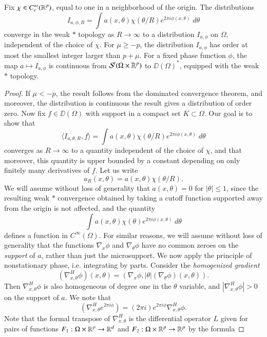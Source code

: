 \begin{theorem}
	Fix $\chi \in C_c^\infty(\operatorname{\mathbb{R}}^p)$, equal to one in a neighborhood of the origin. The distributions
	\[ I_{a,\phi,R} = \int a(x,\theta) \chi(\theta / R) e^{2 \pi i \phi(x,\theta)}\; d\theta \]
	converge in the weak $*$ topology as $R \to \infty$ to a distribution $I_{a,\phi}$ on $\Omega$, independent of the choice of $\chi$. For $\mu \geq -p$, the distribution $I_{a,\phi}$ has order at most the smallest integer larger than $p + \mu$. For a fixed phase function $\phi$, the map $a \mapsto I_{a,\phi}$ is continuous from $\operatorname{\mathcal{S}}^t(\Omega \times \operatorname{\mathbb{R}}^p)$ to $\DD(\Omega)^*$, equipped with the weak $*$ topology.
\end{theorem}
\begin{proof}
	If $\mu < -p$, the result follows from the dominated convergence theorem, and moreover, the distribution is continuous the result gives a distribution of order zero. Now fix $f \in \DD(\Omega)$ with support in a compact set $K \subset \Omega$. Our goal is to show that
	\[ \langle I_{a,\theta,R}, f \rangle = \int a(x,\theta) \chi(\theta / R) e^{2 \pi i \phi(x,\theta)}\; d\theta \]
	converges as $R \to \infty$ to a quantity independent of the choice of $\chi$, and that moreover, this quantity is upper bounded by a constant depending on only finitely many derivatives of $f$. Let us write
	\[ a_R(x,\theta) = a(x, \theta) \chi(\theta / R). \]
	We will assume without loss of generality that $a(x,\theta) = 0$ for $|\theta| \leq 1$, since the resulting weak $*$ convergence obtained by taking a cutoff function supported away from the origin is not affected, and the quantity
	\[ \int a(x,\theta) \chi(\theta) e^{2 \pi i \phi(x,\theta)}\; d\theta \]
	defines a function in $C^\infty(\Omega)$. For similar reasons, we will assume without loss of generality that the functions $\nabla_x \phi$ and $\nabla_\theta \phi$ have no common zeroes on the \emph{support} of $a$, rather than just the microsupport. We now apply the principle of nonstationary phase, i.e. integrating by parts. Consider the \emph{homogenized gradient}
	\[ (\nabla_{x,\theta}^H \phi)(x,\theta) = ( \nabla_x \phi, |\theta| (\nabla_\theta \phi)(x,\theta) ). \]
	Then $\nabla_{x,\theta}^H \phi$ is also homogeneous of degree one in the $\theta$ variable, and $|\nabla_{x,\theta}^H \phi| > 0$ on the support of $a$. We note that
	\[ (\nabla_{x,\theta}^H e^{2 \pi i \phi} ) = (2 \pi i) e^{2 \pi i \phi} \nabla_{x,\theta}^H \phi. \]
	Note that the formal transpose of $\nabla_{x,\theta}^H$ is the differential operator $L$ given for pairs of functions $F_1: \Omega \times \operatorname{\mathbb{R}}^p \to \operatorname{\mathbb{R}}^d$ and $F_2: \Omega \times \operatorname{\mathbb{R}}^p \to \operatorname{\mathbb{R}}^p$ by the formula

\end{proof}
